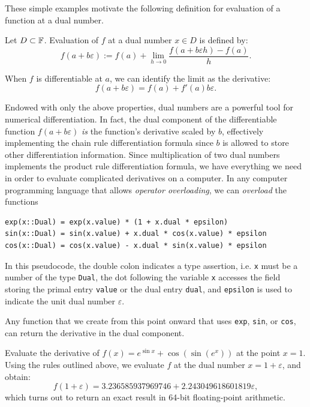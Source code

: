 These simple examples motivate the following definition for evaluation of a function at a dual number.
\begin{definition}
Let $D\subset\mathbb{F}$. Evaluation of $f$ at a dual number $x\in D$ is defined by:
\begin{equation}
f(a+b\varepsilon) := f(a) + \lim_{h\to0}\dfrac{f(a+b\varepsilon h)-f(a)}{h}.
\end{equation}
\end{definition}
When $f$ is differentiable at $a$, we can identify the limit as the derivative:
\[
f(a+b\varepsilon) = f(a) + f'(a)b\varepsilon.
\]

Endowed with only the above properties, dual numbers are a powerful tool for numerical differentiation. In fact, the dual component of the differentiable function $f(a+b\varepsilon)$ {\em is} the function's derivative scaled by $b$, effectively implementing the chain rule differentiation formula since $b$ is allowed to store other differentiation information. Since multiplication of two dual numbers implements the product rule differentiation formula, we have everything we need in order to evaluate complicated derivatives on a computer. In any computer programming language that allows {\em operator overloading}, we can {\em overload} the functions 
\begin{verbatim}
exp(x::Dual) = exp(x.value) * (1 + x.dual * epsilon)
sin(x::Dual) = sin(x.value) + x.dual * cos(x.value) * epsilon
cos(x::Dual) = cos(x.value) - x.dual * sin(x.value) * epsilon
\end{verbatim}
In this pseudocode, the double colon indicates a type assertion, i.e. \verb+x+ must be a number of the type \verb+Dual+, the dot following the variable \verb+x+ accesses the field storing the primal entry \verb+value+ or the dual entry \verb+dual+, and \verb+epsilon+ is used to indicate the unit dual number $\varepsilon$.

Any function that we create from this point onward that uses \verb+exp+, \verb+sin+, or \verb+cos+, can return the derivative in the dual component.

\begin{example}
Evaluate the derivative of $f(x) = e^{\sin x} + \cos(\sin(e^x))$ at the point $x=1$. Using the rules outlined above, we evaluate $f$ at the dual number $x = 1 + \varepsilon$, and obtain:
\[
f(1+\varepsilon) = 3.236585937969746 + 2.243049618601819\varepsilon,
\]
which turns out to return an exact result in 64-bit floating-point arithmetic.
\end{example}

